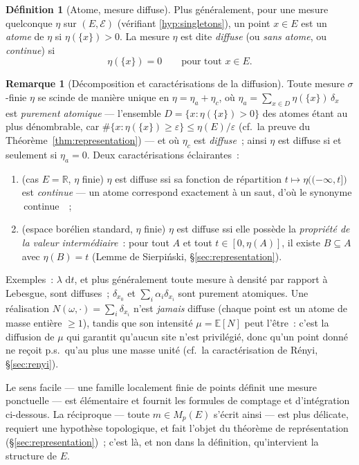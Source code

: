 \documentclass[11pt,a4paper]{article}
\providecommand{\og}{\guillemotleft\,}\providecommand{\fg}{\,\guillemotright}
\theoremstyle{plain}
\theoremstyle{definition}
\newtheorem{definition}[theoreme]{Définition}
\newtheorem{remarque}[theoreme]{Remarque}
\newcommand{\R}{\mathbb{R}}
\newcommand{\E}{\mathbb{E}}
\newcommand{\Mp}{M_p}
\newcommand{\dd}{\,\mathrm{d}}
\newcommand{\eps}{\varepsilon}
\newcommand{\calE}{\mathcal{E}}
\begin{document}
\begin{definition}[Atome, mesure diffuse]\label{def:diffuse}
Plus généralement, pour une mesure quelconque $\eta$ sur $(E,\calE)$ (vérifiant \eqref{hyp:singletons}), un point $x\in E$ est un \emph{atome} de $\eta$ si $\eta(\{x\})>0$. La mesure $\eta$ est dite \emph{diffuse} (ou \emph{sans atome}, ou \emph{continue}) si
\[
\eta(\{x\})=0\qquad\text{pour tout }x\in E.
\]
\end{definition}

\begin{remarque}[Décomposition et caractérisations de la diffusion]\label{rem:diffuse}
Toute mesure $\sigma$-finie $\eta$ se scinde de manière unique en $\eta=\eta_a+\eta_c$, où $\eta_a=\sum_{x\in D}\eta(\{x\})\,\delta_x$ est \emph{purement atomique} --- l'ensemble $D=\{x:\eta(\{x\})>0\}$ des atomes étant au plus dénombrable, car $\#\{x:\eta(\{x\})\ge\eps\}\le\eta(E)/\eps$ (cf.\ la preuve du Théorème~\ref{thm:representation}) --- et où $\eta_c$ est \emph{diffuse}~; ainsi $\eta$ est diffuse si et seulement si $\eta_a=0$. Deux caractérisations éclairantes~:
\begin{enumerate}[label=\textup{(\roman*)}]
\item (cas $E=\R$, $\eta$ finie) $\eta$ est diffuse ssi sa fonction de répartition $t\mapsto\eta\big((-\infty,t]\big)$ est \emph{continue} --- un atome correspond exactement à un saut, d'où le synonyme \og continue \fg{}~;
\item (espace borélien standard, $\eta$ finie) $\eta$ est diffuse ssi elle possède la \emph{propriété de la valeur intermédiaire}~: pour tout $A$ et tout $t\in[0,\eta(A)]$, il existe $B\subseteq A$ avec $\eta(B)=t$ (Lemme de Sierpiński, \S\ref{sec:representation}).
\end{enumerate}
Exemples~: $\lambda\,\dd t$, et plus généralement toute mesure à densité par rapport à Lebesgue, sont diffuses~; $\delta_{x_0}$ et $\sum_i\alpha_i\delta_{x_i}$ sont purement atomiques. Une réalisation $N(\omega,\cdot)=\sum_i\delta_{x_i}$ n'est \emph{jamais} diffuse (chaque point est un atome de masse entière $\ge1$), tandis que son intensité $\mu=\E[N]$ peut l'être~: c'est la diffusion de $\mu$ qui garantit qu'aucun site n'est privilégié, donc qu'un point donné ne reçoit p.s.\ qu'au plus une masse unité (cf.\ la caractérisation de Rényi, \S\ref{sec:renyi}).
\end{remarque} Le sens facile --- une famille localement finie de points définit une mesure ponctuelle --- est élémentaire et fournit les formules de comptage et d'intégration ci-dessous. La réciproque --- toute $m\in\Mp(E)$ s'écrit ainsi --- est plus délicate, requiert une hypothèse topologique, et fait l'objet du théorème de représentation (\S\ref{sec:representation})~; c'est là, et non dans la définition, qu'intervient la structure de $E$.
\end{document}
